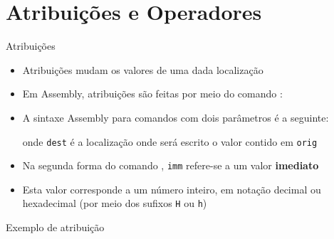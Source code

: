 \section{Atribuições e Operadores}

\begin{frame}[fragile]{Atribuições}

    \begin{itemize}
        \item Atribuições mudam os valores de uma dada localização

        \item Em Assembly, atribuições são feitas por meio do comando :


        \item A sintaxe Assembly para comandos com dois parâmetros é a seguinte:
    

        onde \texttt{dest} é a localização onde será escrito o valor contido em \texttt{orig}

        \item Na segunda forma do comando , \texttt{imm} refere-se a um valor
            \textbf{imediato}

        \item Esta valor corresponde a um número inteiro, em notação decimal ou hexadecimal (por
            meio dos sufixos \texttt{H} ou \texttt{h})

    \end{itemize}

\end{frame}

\begin{frame}[fragile]{Exemplo de atribuição}
\end{frame}

